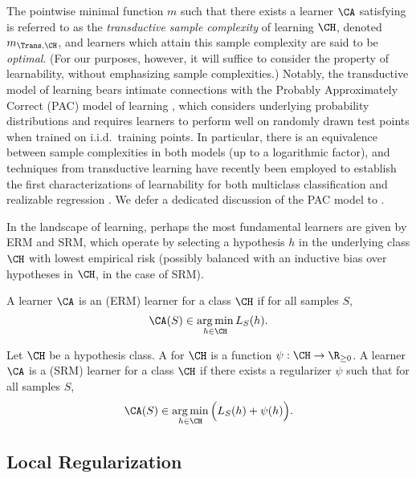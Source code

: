 The pointwise minimal function $m$ such that there exists a learner $\CA$ satisfying  is referred to as the \emph{transductive sample complexity} of learning $\CH$, denoted $m_{\Trans, \CH}$, and learners which attain this sample complexity are said to be \emph{optimal}. (For our purposes, however, it will suffice to consider the property of learnability, without emphasizing sample complexities.) Notably, the transductive model of learning bears intimate connections with the Probably Approximately Correct (PAC) model of learning \citep{valiant1984theory}, which considers underlying probability distributions and requires learners to perform well on  randomly drawn test points when trained on i.i.d.\ training points. In particular, there is an equivalence between sample complexities in both models (up to a logarithmic factor), and techniques from transductive learning have recently been employed to establish the first characterizations of learnability for both multiclass classification and realizable regression \citep{brukhim2022characterization, attias2023optimal}. 
We defer a dedicated discussion of the PAC model to .

In the landscape of learning, perhaps the most fundamental learners are given by ERM and SRM, which operate by selecting a hypothesis $h$ in the underlying class $\CH$ with lowest empirical risk (possibly balanced with an inductive bias over hypotheses in $\CH$, in the case of SRM). 

\begin{definition}\label{Definition:ERM}
A learner $\CA$ is an  (ERM) learner for a class $\CH$ if for all samples $S$, 
\[ \CA(S) \in \argmin_{h \in \CH} L_{S}(h). \] 
\end{definition}

\begin{definition}\label{Definition:SRM}
Let $\CH$ be a hypothesis class. A  for $\CH$ is a function $\psi: \CH \to \R_{\geq 0}$.
A learner $\CA$ is a  (SRM) learner for a class $\CH$ if there exists a regularizer $\psi$ such that for all samples $S$, 
\[ \CA(S) \in \argmin_{h \in \CH} \Big( L_{S}(h) + \psi(h) \Big). \]
\end{definition}

\subsection{Local Regularization}

